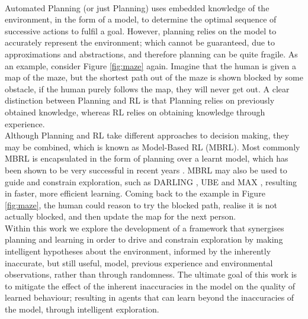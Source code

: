 \\Automated Planning (or just Planning) \citep{DBLP:books/aw/RN2020, Lav06} uses embedded knowledge of the environment, in the form of a model, to determine the optimal sequence of successive actions to fulfil a goal. However, planning relies on the model to accurately represent the environment; which cannot be guaranteed, due to approximations and abstractions, and therefore planning can be quite fragile. As an example, consider Figure \ref{fig:maze} again. Imagine that the human is given a map of the maze, but the shortest path out of the maze is shown blocked by some obstacle, if the human purely follows the map, they will never get out. A clear distinction between Planning and RL is that Planning relies on previously obtained knowledge, whereas RL relies on obtaining knowledge through experience.
\\Although Planning and RL take different approaches to decision making, they may be combined, which is known as Model-Based RL (MBRL). Most commonly MBRL is encapsulated in the form of planning over a learnt model, which has been shown to be very successful in recent years  \citep{silver2017mastering, pmlr-v28-levine13}. MBRL may also be used to guide and constrain exploration, such as DARLING \citep{AIJ16-leonetti}, UBE \citep{DBLP:journals/corr/abs-1709-05380} and MAX \citep{DBLP:journals/corr/abs-1810-12162}, resulting in faster, more efficient learning. Coming back to the example in Figure \ref{fig:maze}, the human could reason to try the blocked path, realise it is not actually blocked, and then update the map for the next person.
\\Within this work we explore the development of a framework that synergises planning and learning in order to drive and constrain exploration by making intelligent hypotheses about the environment, informed by the inherently inaccurate, but still useful, model, previous experience and environmental observations, rather than through randomness. The ultimate goal of this work is to mitigate the effect of the inherent inaccuracies in the model on the quality of learned behaviour; resulting in agents that can learn beyond the inaccuracies of the model, through intelligent exploration.

